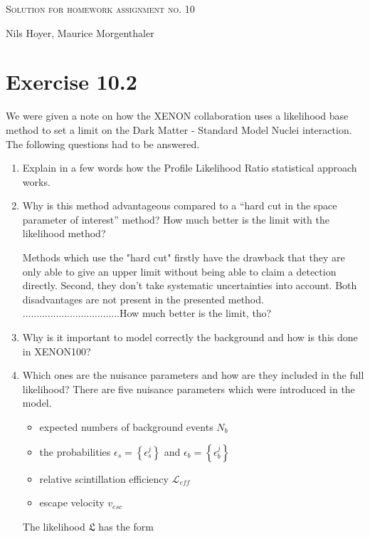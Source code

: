\documentclass[10pt]{article}
\newenvironment{myfont}{\fontfamily{put}\selectfont}{\par}
\newcommand{\likelihood}{\mathfrak{L}}
\begin{document}
\begin{myfont}

\begin{center}
  \begin{Large}
    \textsc{Solution for homework assignment no. 10} \\
  \end{Large}
	\vspace*{0.4cm}
    Nils Hoyer, Maurice Morgenthaler
  \vspace*{1cm}
\end{center}

\section*{Exercise 10.2}
 We were given a note on how the XENON collaboration uses a likelihood base method to set a limit on the Dark Matter - Standard Model Nuclei interaction. The following questions had to be answered.

\begin{enumerate}[label = \textbf{\roman*}.]
  \item Explain in a few words how the Profile Likelihood Ratio statistical approach works.
  \noindent
  
  \item Why is this method advantageous compared to a “hard cut in the space parameter of interest” method?  How much better is the limit with the likelihood method?
  \noindent
  
  Methods which use the "hard cut" firstly have the drawback that they are only able to give an upper limit without being able to claim a detection directly. Second, they don't take systematic uncertainties into account. Both disadvantages are not present in the presented method. ...................................How much better is the limit, tho? 

  \item Why is it important to model correctly the background and how is this done in XENON100?
  \noindent
  
  
  
  \item Which  ones  are  the  nuisance  parameters  and  how  are  they  included  in  the  full likelihood?
  \noindent
  There are five nuisance parameters which were introduced in the model.
  \begin{itemize}
      \item expected numbers of background events $N_b$
      \item the probabilities $\epsilon_s = \left\{ \epsilon^j_s\right\}$ and $\epsilon_b = \left\{ \epsilon^j_b\right\}$ 
      \item relative scintillation efficiency $\mathcal{L}_{eff}$
      \item escape velocity $v_{esc}$
  \end{itemize}
  The likelihood $\likelihood$ has the form 
  

\end{enumerate}
\end{myfont}
\end{document}
